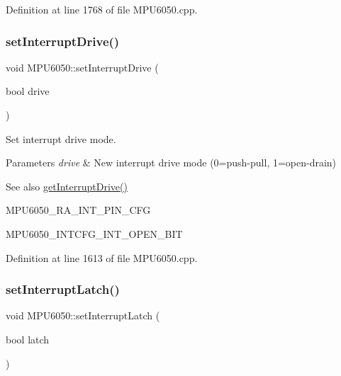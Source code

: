 Definition at line 1768 of file M\+P\+U6050.\+cpp.

\mbox{\label{classMPU6050_a9d9d6aeea346e6f6fad8e4a428cf3301}} 
\subsubsection{\texorpdfstring{setInterruptDrive()}{setInterruptDrive()}}
{\footnotesize\ttfamily void M\+P\+U6050\+::set\+Interrupt\+Drive (\begin{DoxyParamCaption}\item[{bool}]{drive }\end{DoxyParamCaption})}



Set interrupt drive mode. 


\begin{DoxyParams}{Parameters}
{\em drive} & New interrupt drive mode (0=push-\/pull, 1=open-\/drain) \\
\hline
\end{DoxyParams}
\begin{DoxySeeAlso}{See also}
\mbox{\hyperlink{classMPU6050_af66e6c7b1885dcf452e73371790fddfd}{get\+Interrupt\+Drive()}} 

M\+P\+U6050\+\_\+\+R\+A\+\_\+\+I\+N\+T\+\_\+\+P\+I\+N\+\_\+\+C\+FG 

M\+P\+U6050\+\_\+\+I\+N\+T\+C\+F\+G\+\_\+\+I\+N\+T\+\_\+\+O\+P\+E\+N\+\_\+\+B\+IT 
\end{DoxySeeAlso}


Definition at line 1613 of file M\+P\+U6050.\+cpp.

\mbox{\label{classMPU6050_abf9ccf9eb6c7156e6660abb76734920a}} 
\subsubsection{\texorpdfstring{setInterruptLatch()}{setInterruptLatch()}}
{\footnotesize\ttfamily void M\+P\+U6050\+::set\+Interrupt\+Latch (\begin{DoxyParamCaption}\item[{bool}]{latch }\end{DoxyParamCaption})}



